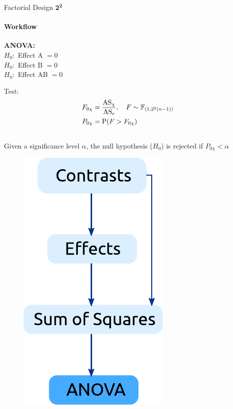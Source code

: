 \begin{frame}{Factorial Design $\pmb{2^2}$}
\framesubtitle{Workflow}\begin{multicols}{2}
\textbf{ANOVA:}\\\vspace{0.5cm} 
$H_0:$ Effect A $ =0$\\ \vspace{0.3cm}
$H_0:$ Effect B $   =0$\\\vspace{0.3cm} 
$H_0:$ Effect AB $ =0$\\\vspace{0.5cm} 

Test:
\begin{align*}
    F_{0\chi} &= \dfrac{\text{AS}_{\chi}}{\text{AS}_e}, \quad F \sim \mathbb{F}_{(1,2^2(n-1))}\\ \vspace{0.5cm}
    P_{0\chi} &= \mathrm{P}(F>F_{0\chi})\\\vspace{0.5cm}
\end{align*}
Given a significance level $\alpha$, the null hypothesis ($H_0$) is rejected if $P_{0\chi} < \alpha$
\columnbreak
\begin{figure}
    \centering
    \centerline{\includegraphics[scale=0.6]{images/anoa.pdf}}
\end{figure}
\end{multicols} 
\end{frame}

